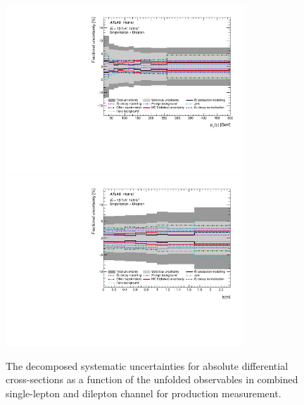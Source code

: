 
\begin{figure}[ht]
  \centering
  \includegraphics[width=0.80\textwidth]{figures/diff_xsec/groupedimpact-absolute-xsec/tty_prod_SLDL/GroupedImpact_tty_prod_pt_SLDL.pdf}\\
  \includegraphics[width=0.80\textwidth]{figures/diff_xsec/groupedimpact-absolute-xsec/tty_prod_SLDL/GroupedImpact_tty_prod_eta_SLDL.pdf}%
\caption{The decomposed systematic uncertainties for absolute differential cross-sections as a function of the unfolded observables in combined single-lepton and dilepton channel for \tty production measurement.}
\label{fig:tty_prod_diff_SLDL_groupedimpact}
\end{figure}
\FloatBarrier

